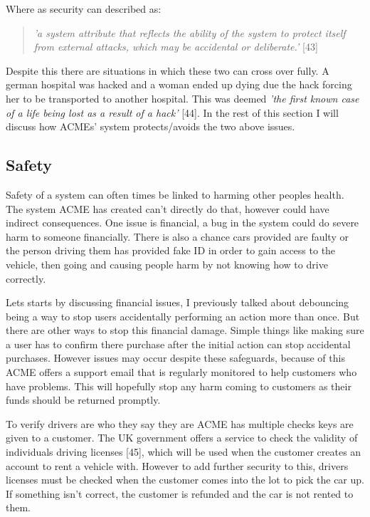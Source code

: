   Where as security can described as:
  \begin{quote}
    \textit{'a system attribute that reflects the ability of the system to protect itself from external attacks, which may be accidental or deliberate.'} [43]
  \end{quote}

  Despite this there are situations in which these two can cross over fully. A german hospital was hacked and a woman ended up dying due the hack forcing her 
  to be transported to another hospital. This was deemed \textit{'the first known case of a life being lost as a result of a hack'} [44].
  In the rest of this section I will discuss how ACMEs' system protects/avoids the two above issues.

  \subsection{Safety}
  Safety of a system can often times be linked to harming other peoples health. The system ACME has created can't directly do that, however could have 
  indirect consequences. One issue is financial, a bug in the system could do severe harm to someone financially. There is also a chance cars provided 
  are faulty or the person driving them has provided fake ID in order to gain access to the vehicle, then going and causing people harm by not knowing 
  how to drive correctly.

  Lets starts by discussing financial issues, I previously talked about debouncing being a way to stop users accidentally performing an action more than
  once. But there are other ways to stop this financial damage. Simple things like making sure a user has to confirm there purchase after the initial 
  action can stop accidental purchases. However issues may occur despite these safeguards, because of this ACME offers a support email that is regularly
  monitored to help customers who have problems. This will hopefully stop any harm coming to customers as their funds should be returned promptly.

  To verify drivers are who they say they are ACME has multiple checks keys are given to a customer. The UK government offers a service to check 
  the validity of individuals driving licenses [45], which will be used when the customer creates an account to rent a vehicle with. However to 
  add further security to this, drivers licenses must be checked when the customer comes into the lot to pick the car up. If something isn't correct,
  the customer is refunded and the car is not rented to them.

